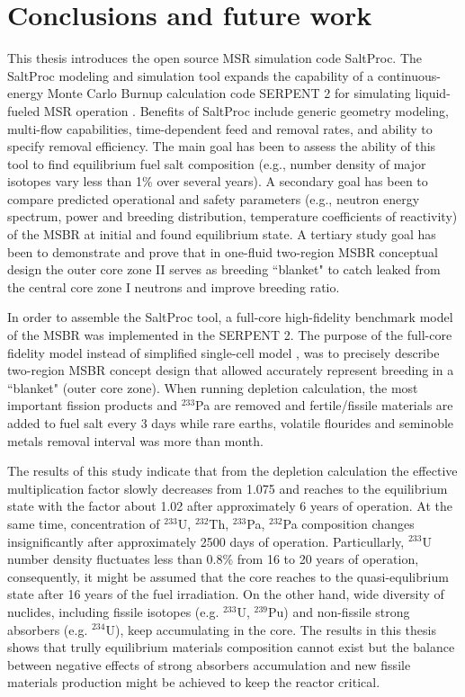 \chapter[Conclusions and furture work]{Conclusions and future work}
This thesis introduces the open source \gls{MSR} simulation code SaltProc. The SaltProc modeling and simulation tool expands the capability of a continuous-energy Monte Carlo Burnup calculation code SERPENT 2 for simulating liquid-fueled \gls{MSR} operation \cite{andrei_rykhlevskii_arfc/saltproc:_2018}. Benefits of SaltProc include generic geometry modeling, multi-flow capabilities, time-dependent feed and removal rates, and ability to specify removal efficiency. The main goal has been to assess the ability of this tool to find equilibrium fuel salt composition (e.g., number density of major isotopes vary less than 1\% over several years). A secondary goal has been to compare predicted operational and safety parameters (e.g., neutron energy spectrum, power and breeding distribution, temperature coefficients of reactivity) of the \gls{MSBR} at initial and found equilibrium state. A tertiary study goal has been to demonstrate and prove that in one-fluid two-region \gls{MSBR} conceptual design the outer core zone II serves as breeding ``blanket" to catch leaked from the central core zone I neutrons and improve breeding ratio.

In order to assemble the SaltProc tool, a full-core high-fidelity benchmark model of the \gls{MSBR} was implemented in the SERPENT 2. The purpose of the full-core fidelity model instead of simplified single-cell model \cite{rykhlevskii_online_2017}, \cite{betzler_molten_2017} was to precisely describe two-region \gls{MSBR} concept design that allowed accurately represent breeding in a ``blanket" (outer core zone). When running depletion calculation, the most important fission products and $^{233}$Pa are removed and fertile/fissile materials are added to fuel salt every 3 days while rare earths, volatile flourides and seminoble metals removal interval was more than month. 

The results of this study indicate that from the depletion calculation the effective multiplication factor slowly decreases from 1.075 and reaches to the equilibrium state with the factor about 1.02 after approximately 6 years of operation. At the same time, concentration of $^{233}$U, $^{232}$Th, $^{233}$Pa, $^{232}$Pa composition changes insignificantly after approximately 2500 days of operation. Particullarly, $^{233}$U number density fluctuates less than 0.8\% from 16 to 20 years of operation, consequently, it might be assumed that the core reaches to the quasi-equlibrium state after 16 years of the fuel irradiation. On the other hand, wide diversity of nuclides, including fissile isotopes (e.g. $^{233}$U, $^{239}$Pu) and non-fissile strong absorbers (e.g. $^{234}$U), keep accumulating in the core. The results in this thesis shows that trully equilibrium materials composition cannot exist but the balance between negative effects of strong absorbers accumulation and new fissile materials production might be achieved to keep the reactor critical.

